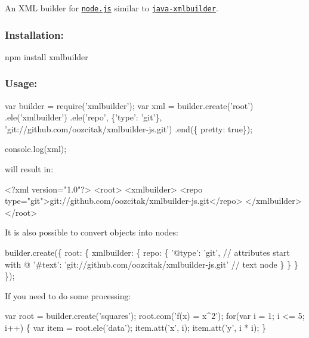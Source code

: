 An X\+ML builder for \href{https://nodejs.org/}{\tt node.\+js} similar to \href{https://github.com/jmurty/java-xmlbuilder}{\tt java-\/xmlbuilder}.

\href{http://opensource.org/licenses/MIT}{\tt } \href{https://npmjs.com/package/xmlbuilder}{\tt } \href{https://npmjs.com/package/xmlbuilder}{\tt }

\href{http://travis-ci.org/oozcitak/xmlbuilder-js}{\tt } \href{https://david-dm.org/oozcitak/xmlbuilder-js}{\tt } \href{https://coveralls.io/github/oozcitak/xmlbuilder-js}{\tt }

\subsubsection*{Installation\+:}


\begin{DoxyCode}
npm install xmlbuilder
\end{DoxyCode}


\subsubsection*{Usage\+:}


\begin{DoxyCode}
var builder = require('xmlbuilder');
var xml = builder.create('root')
  .ele('xmlbuilder')
    .ele('repo', \{'type': 'git'\}, 'git://github.com/oozcitak/xmlbuilder-js.git')
  .end(\{ pretty: true\});

console.log(xml);
\end{DoxyCode}


will result in\+:


\begin{DoxyCode}
<?xml version="1.0"?>
<root>
  <xmlbuilder>
    <repo type="git">git://github.com/oozcitak/xmlbuilder-js.git</repo>
  </xmlbuilder>
</root>
\end{DoxyCode}


It is also possible to convert objects into nodes\+:


\begin{DoxyCode}
builder.create(\{
  root: \{
    xmlbuilder: \{
      repo: \{
        '@type': 'git', // attributes start with @
        '#text': 'git://github.com/oozcitak/xmlbuilder-js.git' // text node
      \}
    \}
  \}
\});
\end{DoxyCode}


If you need to do some processing\+:


\begin{DoxyCode}
var root = builder.create('squares');
root.com('f(x) = x^2');
for(var i = 1; i <= 5; i++)
\{
  var item = root.ele('data');
  item.att('x', i);
  item.att('y', i * i);
\}
\end{DoxyCode}


